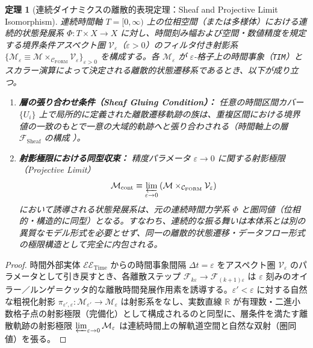 \documentclass[11pt,a4paper]{ltjsarticle}
\theoremstyle{definition}
\theoremstyle{plain}
\newtheorem{theorem}{定理}[section]
\theoremstyle{remark}
\newcommand{\Cform}{\mathcal{C}_{\mathrm{FORM}}}
\begin{document}
\begin{theorem}[連続ダイナミクスの離散的表現定理：Sheaf and Projective Limit Isomorphism]\label{thm:continuous}
連続時間軸 $T = [0, \infty)$ 上の位相空間（または多様体）における連続的状態発展系 $\Phi : T \times X \to X$ に対し、時間刻み幅および空間・数値精度を規定する境界条件アスペクト圏 $\mathcal{V}_{\varepsilon}$（$\varepsilon > 0$）のフィルタ付き射影系 $\{\mathcal{M}_{\varepsilon} \equiv \mathcal{M} \times_{\Cform} \mathcal{V}_{\varepsilon}\}_{\varepsilon > 0}$ を構成する。各 $\mathcal{M}_{\varepsilon}$ が $\varepsilon$-格子上の時間事象（\texttt{TIM}）とスカラー演算によって決定される離散的状態遷移系であるとき、以下が成り立つ。
\begin{enumerate}
    \item \textbf{層の張り合わせ条件（Sheaf Gluing Condition）：} 任意の時間区間カバー $\{U_i\}$ 上で局所的に定義された離散遷移軌跡の族は、重複区間における境界値の一致のもとで一意の大域的軌跡へと張り合わされる（時間軸上の層 $\mathcal{F}_{\mathrm{Sheaf}}$ の構成 \cite{maclane1992}）。
    \item \textbf{射影極限における同型収束：} 精度パラメータ $\varepsilon \to 0$ に関する射影極限（Projective Limit）
    \begin{equation}
    \mathcal{M}_{\mathrm{cont}} \equiv \varprojlim_{\varepsilon \to 0} \left(\mathcal{M} \times_{\Cform} \mathcal{V}_{\varepsilon}\right)
    \end{equation}
    において誘導される状態発展系は、元の連続時間力学系 $\Phi$ と圏同値（位相的・構造的に同型）となる。すなわち、連続的な振る舞いは本体系とは別の異質なモデル形式を必要とせず、同一の離散的状態遷移・データフロー形式の極限構造として完全に内包される。
\end{enumerate}
\end{theorem}

\begin{proof}
時間外部実体 $\mathcal{EE}_{\mathrm{Time}}$ からの時間事象間隔 $\Delta t = \varepsilon$ をアスペクト圏 $\mathcal{V}_{\varepsilon}$ のパラメータとして引き戻すとき、各離散ステップ $\mathcal{F}_{k\varepsilon} \to \mathcal{F}_{(k+1)\varepsilon}$ は $\varepsilon$ 刻みのオイラー／ルンゲ＝クッタ的な離散時間発展作用素を誘導する。$\varepsilon' < \varepsilon$ に対する自然な粗視化射影 $\pi_{\varepsilon', \varepsilon} : \mathcal{M}_{\varepsilon'} \to \mathcal{M}_{\varepsilon}$ は射影系をなし、実数直線 $\mathbb{R}$ が有理数・二進小数格子点の射影極限（完備化）として構成されるのと同型に、層条件を満たす離散軌跡の射影極限 $\varprojlim_{\varepsilon \to 0} \mathcal{M}_{\varepsilon}$ は連続時間上の解軌道空間と自然な双射（圏同値）を張る。
\end{proof}
\end{document}

